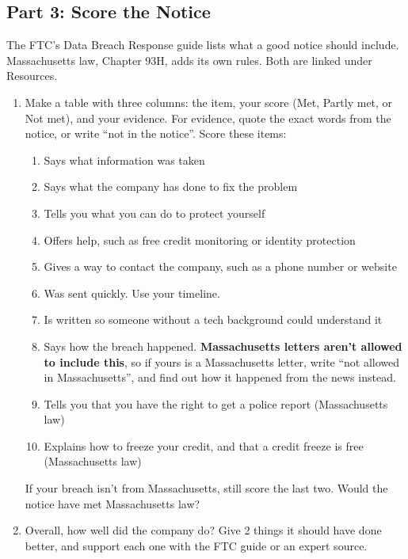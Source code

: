 \documentclass[12pt]{article}
\begin{document}
\subsection*{Part 3: Score the Notice}
The FTC's Data Breach Response guide lists what a good notice should include. Massachusetts law, Chapter 93H, adds its own rules. Both are linked under Resources.
\begin{enumerate}[start=6]
    \item Make a table with three columns: the item, your score (Met, Partly met, or Not met), and your evidence. For evidence, quote the exact words from the notice, or write ``not in the notice''. Score these items:
    \begin{enumerate}
        \item Says what information was taken
        \item Says what the company has done to fix the problem
        \item Tells you what you can do to protect yourself
        \item Offers help, such as free credit monitoring or identity protection
        \item Gives a way to contact the company, such as a phone number or website
        \item Was sent quickly. Use your timeline.
        \item Is written so someone without a tech background could understand it
        \item Says how the breach happened. \textbf{Massachusetts letters aren't allowed to include this}, so if yours is a Massachusetts letter, write ``not allowed in Massachusetts'', and find out how it happened from the news instead.
        \item Tells you that you have the right to get a police report (Massachusetts law)
        \item Explains how to freeze your credit, and that a credit freeze is free (Massachusetts law)
    \end{enumerate}
    If your breach isn't from Massachusetts, still score the last two. Would the notice have met Massachusetts law?
    \item Overall, how well did the company do? Give 2 things it should have done better, and support each one with the FTC guide or an expert source.
\end{enumerate}
\end{document}
